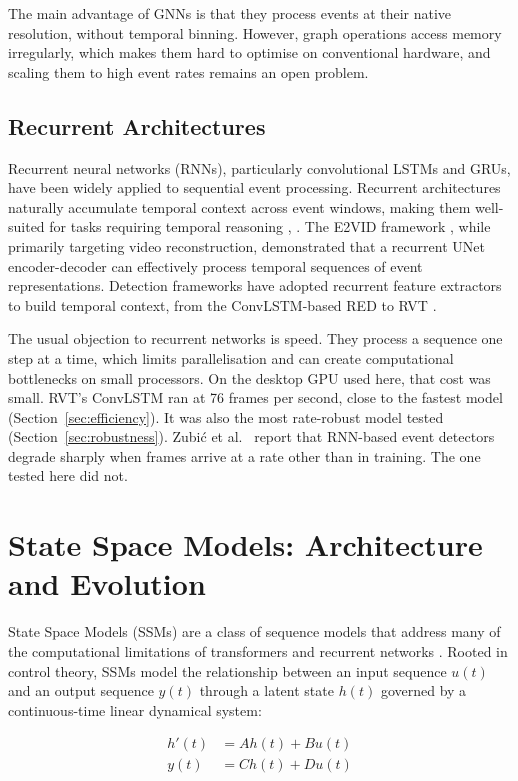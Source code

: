 \documentclass[11pt, a4paper]{report}
\begin{document}
The main advantage of GNNs is that they process events at their native resolution, without temporal binning.
However, graph operations access memory irregularly, which makes them hard to optimise on conventional
hardware, and scaling them to high event rates remains an open problem.

\subsection{Recurrent Architectures}
Recurrent neural networks (RNNs), particularly convolutional LSTMs and GRUs, have been widely applied to sequential event processing. Recurrent architectures naturally accumulate temporal context across event windows, making them well-suited for tasks requiring temporal reasoning \cite{rebecq2019e2vid}, \cite{cannici2019attention}. The E2VID framework \cite{rebecq2019e2vid}, while primarily targeting video reconstruction, demonstrated that a recurrent UNet encoder-decoder can effectively process temporal sequences of event representations. Detection frameworks have adopted recurrent feature extractors to build temporal context, from the ConvLSTM-based RED \cite{perot2020learning} to RVT \cite{gehrig2023recurrent}.

The usual objection to recurrent networks is speed. They process a sequence one step at a time, which limits
parallelisation and can create computational bottlenecks on small processors. On the desktop GPU used here,
that cost was small. RVT's ConvLSTM ran at 76 frames per second, close to the fastest model
(Section~\ref{sec:efficiency}). It was also the most rate-robust model tested (Section~\ref{sec:robustness}).
Zubi\'{c} et al.~\cite{zubic2024state} report that RNN-based event detectors degrade sharply when frames arrive
at a rate other than in training. The one tested here did not.

\section{State Space Models: Architecture and Evolution}
State Space Models (SSMs) are a class of sequence models that address many of the computational limitations of transformers and recurrent networks \cite{gu2022efficiently}. Rooted in control theory, SSMs model the relationship between an input sequence $u(t)$ and an output sequence $y(t)$ through a latent state $h(t)$ governed by a continuous-time linear dynamical system:

\begin{align}
    h'(t) &= Ah(t) + Bu(t) \\
    y(t) &= Ch(t) + Du(t)
\end{align}
\end{document}
